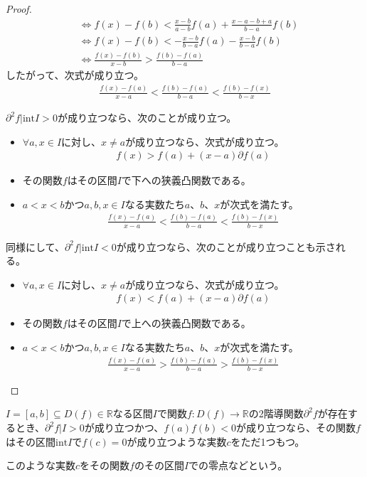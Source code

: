 \documentclass[dvipdfmx]{jsarticle}
\begin{document}
\begin{proof}
\begin{align*}
&\Leftrightarrow f(x) - f(b) < \frac{x - b}{a - b}f(a) + \frac{x - a - b + a}{b - a}f(b)\\
&\Leftrightarrow f(x) - f(b) < - \frac{x - b}{b - a}f(a) - \frac{x - b}{b - a}f(b)\\
&\Leftrightarrow \frac{f(x) - f(b)}{x - b} > \frac{f(b) - f(a)}{b - a}
\end{align*}
したがって、次式が成り立つ。
\begin{align*}
\frac{f(x) - f(a)}{x - a} < \frac{f(b) - f(a)}{b - a} < \frac{f(b) - f(x)}{b - x}
\end{align*}\par
$\partial^{2}f|\mathrm{int}I > 0$が成り立つなら、次のことが成り立つ。
\begin{itemize}
\item
  $\forall a,x \in I$に対し、$x \neq a$が成り立つなら、次式が成り立つ。
\begin{align*}
f(x) > f(a) + (x - a)\partial f(a)
\end{align*}
\item
  その関数$f$はその区間$I$で下への狭義凸関数である。
\item
  $a < x < b$かつ$a,b,x \in I$なる実数たち$a$、$b$、$x$が次式を満たす。
\begin{align*}
\frac{f(x) - f(a)}{x - a} < \frac{f(b) - f(a)}{b - a} < \frac{f(b) - f(x)}{b - x}
\end{align*}
\end{itemize}\par
同様にして、$\partial^{2}f|\mathrm{int}I < 0$が成り立つなら、次のことが成り立つことも示される。
\begin{itemize}
\item
  $\forall a,x \in I$に対し、$x \neq a$が成り立つなら、次式が成り立つ。
\begin{align*}
f(x) < f(a) + (x - a)\partial f(a)
\end{align*}
\item
  その関数$f$はその区間$I$で上への狭義凸関数である。
\item
  $a < x < b$かつ$a,b,x \in I$なる実数たち$a$、$b$、$x$が次式を満たす。
\begin{align*}
\frac{f(x) - f(a)}{x - a} > \frac{f(b) - f(a)}{b - a} > \frac{f(b) - f(x)}{b - x}
\end{align*}
\end{itemize}
\end{proof}
\begin{thm}\label{4.2.2.18}
$I = [ a,b] \subseteq D(f) \in \mathbb{R}$なる区間$I$で関数$f:D(f) \rightarrow \mathbb{R}$の2階導関数$\partial^{2}f$が存在するとき、$\partial^{2}f|I > 0$が成り立つかつ、$f(a)f(b) < 0$が成り立つなら、その関数$f$はその区間$\mathrm{int}I$で$f(c) = 0$が成り立つような実数$c$をただ1つもつ。\par
このような実数$c$をその関数$f$のその区間$I$での零点などという。
\end{thm}
\end{document}
